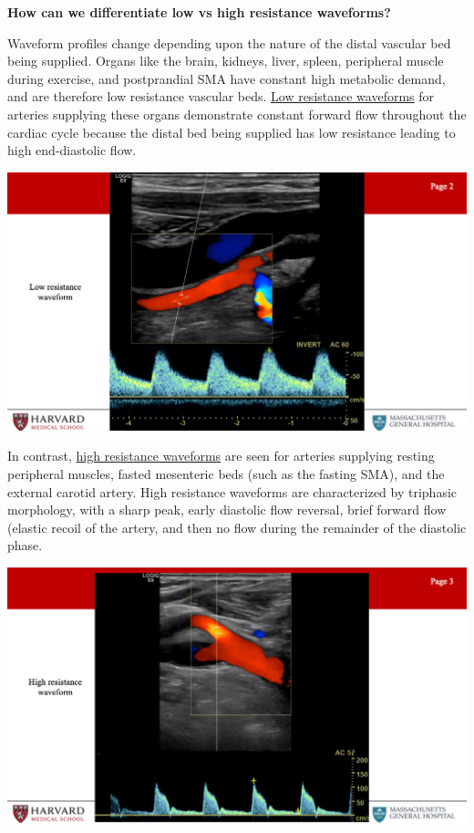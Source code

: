 \documentclass[
]{book}
\begin{document}
\textbf{How can we differentiate low vs high resistance waveforms?}

Waveform profiles change depending upon the nature of the distal
vascular bed being supplied. Organs like the brain, kidneys, liver,
spleen, peripheral muscle during exercise, and postprandial SMA have
constant high metabolic demand, and are therefore low resistance
vascular beds. \uline{Low resistance waveforms} for arteries
supplying these organs demonstrate constant forward flow throughout the
cardiac cycle because the distal bed being supplied has low resistance
leading to high end-diastolic flow.

\includegraphics[width=15.01in]{images/vasc_lab2/Slide3}

In contrast, \uline{high resistance waveforms} are seen for
arteries supplying resting peripheral muscles, fasted mesenteric beds
(such as the fasting SMA), and the external carotid artery. High
resistance waveforms are characterized by triphasic morphology, with a
sharp peak, early diastolic flow reversal, brief forward flow (elastic
recoil of the artery, and then no flow during the remainder of the
diastolic phase.

\includegraphics[width=15.01in]{images/vasc_lab2/Slide4}
\end{document}
